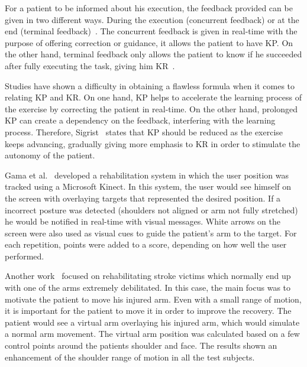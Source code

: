 For a patient to be informed about his execution, the feedback provided can be given in two different ways. During the execution
(concurrent feedback) or at the end (terminal feedback)~\cite{Sigrist2013}.
The concurrent feedback is given in real-time with the purpose of offering correction or guidance, 
it allows the patient to have \ac{KP}. On the other hand, terminal feedback only allows the patient 
to know if he succeeded after fully executing the task, giving him \ac{KR}~\cite{Design2005, Schonauer2011a}. 

Studies have shown a difficulty in obtaining a flawless formula when it comes to relating \ac{KP} and \ac{KR}. 
On one hand, \ac{KP} helps to accelerate the learning process of the exercise by correcting the patient in
real-time. On the other hand, prolonged \ac{KP} can create a dependency on the feedback, interfering with the 
learning process. Therefore, Sigrist~\cite{Sigrist2013} states that \ac{KP} should be reduced as the exercise
keeps advancing, gradually giving more emphasis to \ac{KR} in order to stimulate the autonomy of the patient.

Gama et al.~\cite{Gama2012a} developed a rehabilitation system in which the user position was tracked using a 
Microsoft Kinect. In this system, the user would see himself on the screen with overlaying targets that represented the desired position. 
If a incorrect posture was detected (shoulders not aligned or arm not fully stretched) he would be notified in real-time with visual messages. 
White arrows on the screen were also used as visual cues to guide the patient's arm to the target.
For each repetition, points were added to a score, depending on how well the user performed.

Another work~\cite{Klein2013} focused on rehabilitating stroke victims which normally end up with one of the arms extremely debilitated.
In this case, the main focus was to motivate the patient to move his injured arm. Even with a small range of motion, it is 
important for the patient to move it in order to improve the recovery. The patient would see a virtual arm overlaying his injured arm, which would simulate a normal arm movement. 
The virtual arm position was calculated based on a few control points around the patients shoulder and face. 
The results shown an enhancement of the shoulder range of motion in all the test subjects.

